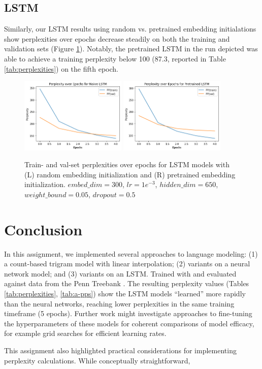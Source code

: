 \documentclass[11pt]{article}
\begin{document}
\subsection{LSTM}

Similarly, our LSTM results using random vs. pretrained embedding initialations show perplexities over epochs decrease steadily on both the training and validation sets (Figure \ref{fig:lstm-pps}). Notably, the pretrained LSTM in the run depicted was able to achieve a training perplexity below 100 (87.3, reported in Table \ref{tab:perplexities}) on the fifth epoch.

\begin{figure}
  \centering
  \includegraphics[width=0.45\textwidth]{figures/lstm_naive_pp.png}
  \includegraphics[width=0.45\textwidth]{figures/lstm_pretrained_pp.png}
  \caption{Train- and val-set perplexities over epochs for LSTM models with (L) random embedding initialization and (R) pretrained embedding initialization. $embed\_dim=300$, $lr=1e^{-3}$, $hidden\_dim=650$, $weight\_bound=0.05$, $dropout=0.5$}
  \label{fig:lstm-pps}
\end{figure}

\section{Conclusion}

In this assignment, we implemented several approaches to language modeling: (1) a count-based trigram model with linear interpolation; (2) variants on a neural network model; and (3) variants on an LSTM. Trained with and evaluated against data from the Penn Treebank \citep{marcus-etal-1993-building}. The resulting perplexity values (Tables \ref{tab:perplexities}, \ref{tab:a-pps}) show the LSTM models ``learned'' more rapidly than the neural networks, reaching lower perplexities in the same training timeframe (5 epochs). Further work might investigate approaches to fine-tuning the hyperparameters of these models for coherent comparisons of model efficacy, for example grid searches for efficient learning rates.

This assignment also highlighted practical considerations for implementing perplexity calculations. While conceptually straightforward, 



\end{document}
